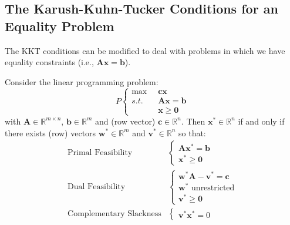\subsection*{The Karush-Kuhn-Tucker Conditions for an Equality Problem}
The KKT conditions can be modified to deal with problems in which we have equality constraints (i.e., $\mathbf{A}\mathbf{x} = \mathbf{b}$).

\begin{corollary} Consider the linear programming problem:
\begin{equation}
P\left\{
\begin{aligned}
\max\;\; & \mathbf{c}\mathbf{x}\\
s.t.\;\; & \mathbf{A}\mathbf{x} = \mathbf{b}\\
& \mathbf{x} \geq \mathbf{0}
\end{aligned}\right.
\end{equation}
with $\mathbf{A} \in \mathbb{R}^{m \times n}$, $\mathbf{b} \in \mathbb{R}^m$ and (row vector) $\mathbf{c} \in \mathbb{R}^n$. Then $\mathbf{x}^* \in \mathbb{R}^n$ if and only if there exists (row) vectors $\mathbf{w}^* \in \mathbb{R}^m$ and $\mathbf{v}^* \in \mathbb{R}^n$ so that:
\begin{align}
\text{Primal Feasibility}&\left\{ 
\begin{aligned}
\mathbf{A}\mathbf{x}^* = \mathbf{b}\\
\mathbf{x}^* \geq \mathbf{0}
\end{aligned}\right.\\
\text{Dual Feasibility}&\left\{ 
\begin{aligned}
\mathbf{w}^*\mathbf{A} - \mathbf{v}^* = \mathbf{c}\\
\mathbf{w}^* \text{ unrestricted}\\
\mathbf{v}^* \geq \mathbf{0}
\end{aligned}\right.\\
\text{Complementary Slackness}&\left\{ 
\begin{aligned}
\mathbf{v}^*\mathbf{x}^* = 0
\end{aligned}\right.
\end{align}
\end{corollary}

